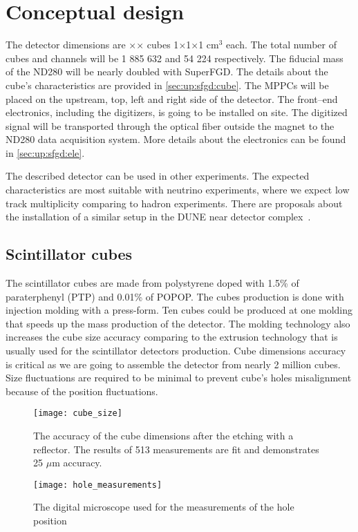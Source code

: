 \documentclass[main.tex]{subfiles}
\begin{document}
\section{Conceptual design}
The detector dimensions are \sfgdx{}$\times$\sfgdz{}$\times$\sfgdy{}  cubes 1$\times$1$\times$1 $\text{cm}^3$ each. The total number of cubes and channels will be 1 885 632 and 54 224 respectively. The fiducial mass of the ND280 will be nearly doubled with SuperFGD. The details about the cube's characteristics are provided in \autoref{sec:up:sfgd:cube}. The MPPCs will be placed on the upstream, top, left and right side of the detector. The front--end electronics, including the digitizers, is going to be installed on site. The digitized signal will be transported through the optical fiber outside the magnet to the ND280 data acquisition system. More details about the electronics can be found in \autoref{sec:up:sfgd:ele}.

The described detector can be used in other experiments. The expected characteristics are most suitable with neutrino experiments, where we expect low track multiplicity comparing to hadron experiments. There are proposals about the installation of a similar setup in the DUNE near detector complex~\cite{Yang2019}.

\subsection{Scintillator cubes}
\label{sec:up:sfgd:cube}
The scintillator cubes are made from polystyrene doped with 1.5\% of paraterphenyl (PTP) and 0.01\% of POPOP. The cubes production is done with injection molding with a press-form. Ten cubes could be produced at one molding that speeds up the mass production of the detector. The molding technology also increases the cube size accuracy comparing to the extrusion technology that is usually used for the scintillator detectors production. Cube dimensions accuracy is critical as we are going to assemble the detector from nearly 2 million cubes. Size fluctuations are required to be minimal to prevent cube's holes misalignment because of the position fluctuations.

\begin{figure}[!ht]
	\centering
	\begin{minipage}{0.40\linewidth}
		\centering
		\texttt{[image: cube\_size]}
		\caption{The accuracy of the cube dimensions after the etching with a reflector. The results of 513 measurements are fit and demonstrates 25 $\mu$m accuracy.}
		\label{fig:up:sfgd:cube_s}
	\end{minipage}
	\begin{minipage}{0.19\linewidth}
	\hspace{\linewidth}
	\end{minipage}
	\begin{minipage}{0.40\linewidth}
		\centering
		\texttt{[image: hole\_measurements]}
		\caption{The digital microscope used for the measurements of the hole position}
		\label{fig:up:sfgd:hole_pos}
	\end{minipage}
\end{figure}
\end{document}
